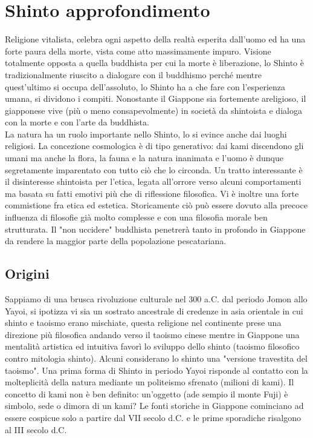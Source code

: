 \documentclass[10pt,a4paper]{report}
\begin{document}
\section{Shinto approfondimento}
Religione vitalista, celebra ogni aspetto della realtà esperita dall'uomo ed ha una forte paura della morte, vista come atto massimamente impuro. Visione totalmente opposta a quella buddhista per cui la morte è liberazione, lo Shinto è tradizionalmente riuscito a dialogare con il buddhismo perché mentre quest'ultimo si occupa dell'assoluto, lo Shinto ha a che fare con l'esperienza umana, si dividono i compiti. Nonostante il Giappone sia fortemente areligioso, il giapponese vive (più o meno consapevolmente) in società da shintoista e dialoga con la morte e con l'arte da buddhista.\\
La natura ha un ruolo importante nello Shinto, lo si evince anche dai luoghi religiosi. La concezione cosmologica è di tipo generativo: dai kami discendono gli umani ma anche la flora, la fauna e la natura inanimata e l'uomo è dunque segretamente imparentato con tutto ciò che lo circonda. Un tratto interessante è il disinteresse shintoista per l'etica, legata all'orrore verso alcuni comportamenti ma basata su fatti emotivi più che di riflessione filosofica. Vi è inoltre una forte commistione fra etica ed estetica. Storicamente ciò può essere dovuto alla precoce influenza di filosofie già molto complesse e con una filosofia morale ben strutturata. Il "non uccidere" buddhista penetrerà tanto in profondo in Giappone da rendere la maggior parte della popolazione pescatariana.  
\subsection{Origini}
Sappiamo di una brusca rivoluzione culturale nel 300 a.C. dal periodo Jomon allo Yayoi, si ipotizza vi sia un sostrato ancestrale di credenze in asia orientale in cui shinto e taoismo erano mischiate, questa religione nel continente prese una direzione più filosofica andando verso il taoismo cinese mentre in Giappone una mentalità artistica ed intuitiva favorì lo sviluppo dello shinto (taoismo filosofico contro mitologia shinto). Alcuni considerano lo shinto una "versione travestita del taoismo". Una prima forma di Shinto in periodo Yayoi risponde al contatto con la molteplicità della natura mediante un politeismo sfrenato (milioni di kami). Il concetto di kami non è ben definito: un'oggetto (ade sempio il monte Fuji) è simbolo, sede o dimora di un kami? Le fonti storiche in Giappone cominciano ad essere cospicue solo a partire dal VII secolo d.C. e le prime sporadiche risalgono al III secolo d.C.
\end{document}
